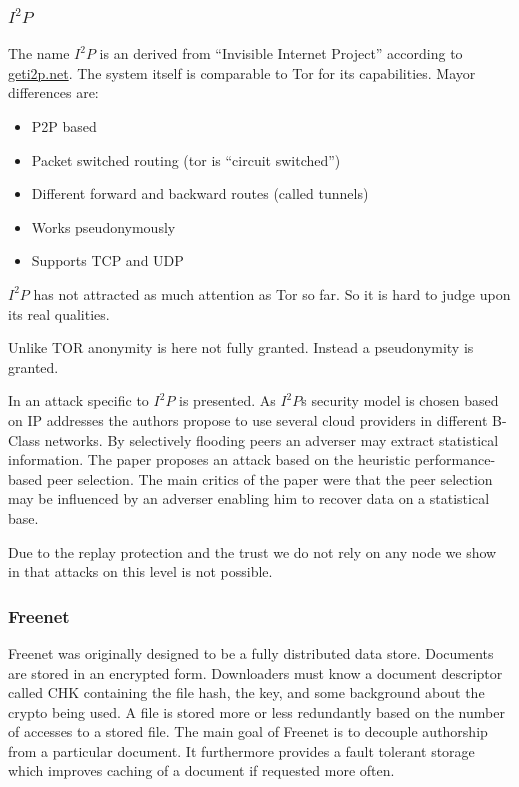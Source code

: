 \documentclass[9pt,journal,compsoc]{IEEEtran}
\begin{document}
\subsubsection{$I^2P$}
The name $I^2P$ is an derived from  ``Invisible Internet Project'' according to \href{https://geti2p.net/}{geti2p.net}. The system itself is comparable to Tor for its capabilities. Mayor differences are:
\begin{itemize}
	\item P2P based
	\item Packet switched routing (tor is ``circuit switched'')
	\item Different forward and backward routes (called tunnels)
	\item Works pseudonymously
	\item Supports TCP and UDP
\end{itemize}

$I^2P$ has not attracted as much attention as Tor so far. So it is hard to judge upon its real qualities. 

Unlike TOR anonymity is here not fully granted. Instead a pseudonymity is granted. 

In \cite{pets2011-i2p} an attack specific to $I^2P$ is presented. As $I^2P$s security model is chosen based on IP addresses the authors propose to use several cloud providers in different B-Class networks. By selectively flooding peers an adverser may extract statistical information. The paper proposes an attack based on the heuristic performance-based peer selection. The main critics of the paper were that the peer selection may be influenced by an adverser enabling him to recover data on a statistical base.

Due to the replay protection and the trust we do not rely on any node we show in \cite{messageVortex} that attacks on this level is not possible.

\subsubsection{Freenet}
Freenet was originally designed to be a fully distributed data store\cite{freenet}. Documents are stored in an encrypted form. Downloaders must know a document descriptor called CHK containing the file hash, the key, and some background about the crypto being used. A file is stored more or less redundantly based on the number of accesses to a stored file. The main goal of Freenet is to decouple  authorship from a particular document. It furthermore provides a fault tolerant storage which improves caching of a document if requested more often.
\end{document}

